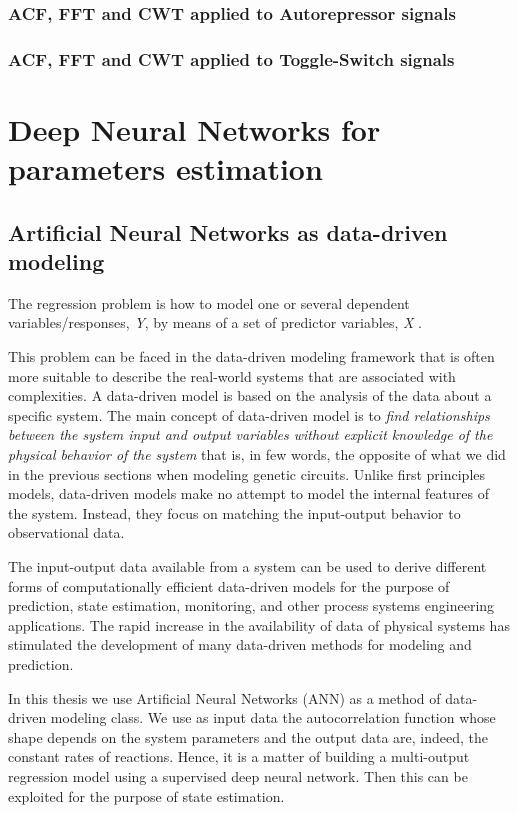 \documentclass[12pt,a4paper]{report}
\begin{document}
\section{ACF, FFT and CWT applied to Autorepressor signals}

\section{ACF, FFT and CWT applied to Toggle-Switch signals}

\part{Deep Neural Networks for parameters estimation}
\chapter{Artificial Neural Networks as data-driven modeling}
The regression problem is how to model one or several dependent variables/responses, \emph{Y}, by means of a set of predictor variables, \emph{X} \cite{datadrivenmodeling}. 

This problem can be faced in the data-driven modeling framework that is often more suitable to describe the real-world systems that are associated with complexities. A data-driven model is based on the analysis of the data about a specific system. The main concept of data-driven model is to \emph{find relationships between the system input and output variables without explicit knowledge of the physical behavior of the system} that is, in few words, the opposite of what we did in the previous sections when modeling genetic circuits. Unlike first principles models, data-driven models make no attempt to model the internal features of the system. Instead, they focus on matching the input-output behavior to observational data. 

The input-output data available from a system can be used to derive different forms of computationally efficient data-driven models for the purpose of prediction, state estimation, monitoring, and other process systems engineering applications. The rapid increase in the availability of data of physical systems has stimulated the development of many data-driven methods for modeling and prediction. 

In this thesis we use Artificial Neural Networks (ANN) as a method of data-driven modeling class. We use as input data the autocorrelation function whose shape depends on the system parameters and the output data are, indeed, the constant rates of reactions. Hence, it is a matter of building a multi-output regression model using a supervised deep neural network. Then this can be exploited for the purpose of state estimation.
\end{document}
